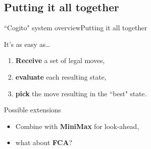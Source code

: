 \subsection{Putting it all together}
\begin{frame}{``Cogito" system overview}{Putting it all together}

\begin{block}{It's as easy as\dots}
\begin{enumerate}
\item \textbf{Receive} a set of legal moves,
\item \textbf{evaluate} each resulting state,
\item \textbf{pick} the move resulting in the ``best" state.
\end{enumerate}  
\end{block}

\begin{block}{Possible extensions}
\begin{itemize}
\item Combine with \textbf{MiniMax} for look-ahead,
\item what about \textbf{FCA}?
\end{itemize}
\end{block}

\end{frame}
